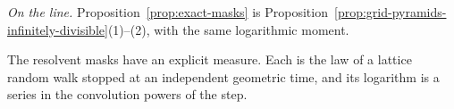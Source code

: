 \emph{On the line.} Proposition~\ref{prop:exact-masks} is
Proposition~\ref{prop:grid-pyramids-infinitely-divisible}(1)--(2), with the same logarithmic
moment.

The resolvent masks have an explicit \Levy{} measure. Each is the law of a lattice random walk
stopped at an independent geometric time, and its logarithm is a series in the convolution powers
of the step.

